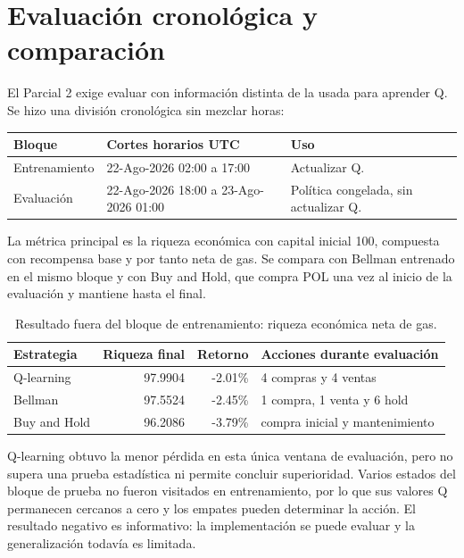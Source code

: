 \documentclass[12pt,letterpaper]{article}
\begin{document}
\section{Evaluación cronológica y comparación}

El Parcial 2 exige evaluar con información distinta de la usada para aprender
Q. Se hizo una división cronológica sin mezclar horas:

\begin{center}
\begin{tabular}{lll}
\toprule
\textbf{Bloque} & \textbf{Cortes horarios UTC} & \textbf{Uso}\\
\midrule
Entrenamiento & 22-Ago-2026 02:00 a 17:00 & Actualizar Q.\\
Evaluación & 22-Ago-2026 18:00 a 23-Ago-2026 01:00 & Política congelada, sin actualizar Q.\\
\bottomrule
\end{tabular}
\end{center}

La métrica principal es la riqueza económica con capital inicial 100, compuesta
con recompensa base y por tanto neta de gas. Se compara con Bellman entrenado en
el mismo bloque y con Buy and Hold, que compra POL una vez al inicio de la
evaluación y mantiene hasta el final.

\begin{table}[h]
\centering
\caption{Resultado fuera del bloque de entrenamiento: riqueza económica neta de gas.}
\begin{tabular}{lrrl}
\toprule
\textbf{Estrategia} & \textbf{Riqueza final} & \textbf{Retorno} & \textbf{Acciones durante evaluación}\\
\midrule
Q-learning & 97.9904 & -2.01\% & 4 compras y 4 ventas\\
Bellman & 97.5524 & -2.45\% & 1 compra, 1 venta y 6 hold\\
Buy and Hold & 96.2086 & -3.79\% & compra inicial y mantenimiento\\
\bottomrule
\end{tabular}
\end{table}

Q-learning obtuvo la menor pérdida en esta única ventana de evaluación, pero no
supera una prueba estadística ni permite concluir superioridad. Varios estados
del bloque de prueba no fueron visitados en entrenamiento, por lo que sus
valores Q permanecen cercanos a cero y los empates pueden determinar la acción.
El resultado negativo es informativo: la implementación se puede evaluar y la
generalización todavía es limitada.
\end{document}
